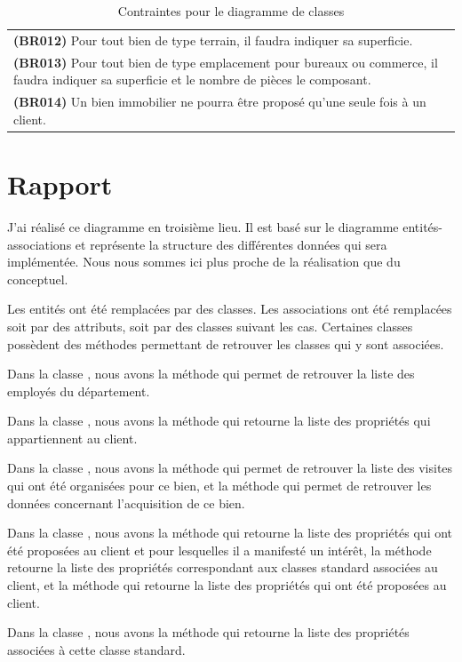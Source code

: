 \begin{table}
\begin{tabular}{|p{}|}
  \textbf{(BR012)} Pour tout bien de type \og{}terrain\fg{}, il faudra indiquer sa superficie. \\
  \textbf{(BR013)} Pour tout bien de type \og{}emplacement pour bureaux ou commerce\fg{}, il faudra indiquer sa superficie et le nombre de pièces le composant. \\
  \textbf{(BR014)} Un bien immobilier ne pourra être proposé qu'une seule fois à un client. \\
  \hline
  \end{tabular}
  \caption{Contraintes pour le diagramme de classes}
  \label{tbl_business_rules}
\end{table}


\section{Rapport}

J'ai réalisé ce diagramme en troisième lieu. Il est basé sur le diagramme entités-associations et représente la structure des différentes données qui sera implémentée. Nous nous sommes ici plus proche de la réalisation que du conceptuel.

Les entités ont été remplacées par des classes. Les associations ont été remplacées soit par des attributs, soit par des classes suivant les cas. Certaines classes possèdent des méthodes permettant de retrouver les classes qui y sont associées.

Dans la classe , nous avons la méthode  qui permet de retrouver la liste des employés du département.

Dans la classe , nous avons la méthode  qui retourne la liste des propriétés qui appartiennent au client.

Dans la classe , nous avons la méthode  qui permet de retrouver la liste des visites qui ont été organisées pour ce bien, et la méthode  qui permet de retrouver les données concernant l'acquisition de ce bien.

Dans la classe , nous avons la méthode  qui retourne la liste des propriétés qui ont été proposées au client et pour lesquelles il a manifesté un intérêt, la méthode  retourne la liste des propriétés correspondant aux classes standard associées au client, et la méthode  qui retourne la liste des propriétés qui ont été proposées au client.

Dans la classe , nous avons la méthode  qui retourne la liste des propriétés associées à cette classe standard.